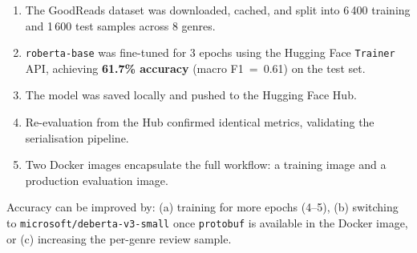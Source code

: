 \documentclass[12pt,a4paper]{article}
\begin{document}
\begin{enumerate}
    \item The GoodReads dataset was downloaded, cached, and split into
          6\,400 training and 1\,600 test samples across 8 genres.
    \item \texttt{roberta-base} was fine-tuned for 3 epochs using the
          Hugging Face \texttt{Trainer} API, achieving \textbf{61.7\% accuracy}
          (macro F1~=~0.61) on the test set.
    \item The model was saved locally and pushed to the Hugging Face Hub.
    \item Re-evaluation from the Hub confirmed identical metrics, validating
          the serialisation pipeline.
    \item Two Docker images encapsulate the full workflow: a training image
          and a production evaluation image.
\end{enumerate}

Accuracy can be improved by: (a) training for more epochs (4--5),
(b) switching to \texttt{microsoft/deberta-v3-small} once \texttt{protobuf}
is available in the Docker image, or (c) increasing the per-genre review sample.
\end{document}
